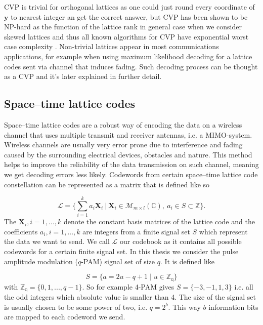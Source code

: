 \documentclass[english,12pt,a4paper,pdftex,sci,utf8]{aaltothesis}
\begin{document}
CVP is trivial for orthogonal lattices as one could just round every coordinate of $\mathbf{y}$ to nearest integer an get the correct answer, but CVP has been shown to be NP-hard as the function of the lattice rank in general case when we consider skewed lattices and thus all known algorithms for CVP have exponential worst case complexity \cite{agrell}. Non-trivial lattices appear in most communications applications, for example when using maximum likelihood decoding for a lattice codes sent via channel that induces fading. Such decoding process can be thought as a CVP and it's later explained in further detail.

\subsection{Space--time lattice codes}

Space--time lattice codes are a robust way of encoding the data on a  wireless channel that uses multiple transmit and receiver antennas, i.e. a MIMO-system. Wireless channels are usually very error prone due to interference and fading caused by the surrounding electrical devices, obstacles and nature. This method helps to improve the reliability of the data transmission on such channel, meaning we get decoding errors less likely. Codewords from certain space--time lattice code constellation can be represented as a matrix that is defined like so

\begin{equation}
\mathcal{L} = \Bigg\{\sum_{i=1}^k a_i\mathbf{X}_i \ \Big| \ \mathbf{X}_i \in \mathcal{M}_{m \times l}(\mathbb{C}), \ a_i \in S \subset \mathbb{Z} \Bigg\}.
\label{eq:codeword}
\end{equation}
The $\mathbf{X}_i, i = 1,...,k$ denote the constant basis matrices of the lattice code and the coefficients $a_i, i = 1,...,k$ are integers from a finite signal set $S$ which represent the data we want to send. We call $\mathcal{L}$ our codebook as it contains all possible codewords for a certain finite signal set. In this thesis we consider the pulse amplitude modulation ($q$-PAM) signal set of size $q$. It is defined like

\begin{equation}
S = \{a = 2u-q+1\mid u \in \mathbb{Z_q}\}
\label{eq:pam}
\end{equation}
with $\mathbb{Z_q} = \{0,1,...,q-1\}$. So for example 4-PAM gives $S = \{-3, -1,1,3\}$ i.e. all the odd integers which absolute value is smaller than 4. The size of the signal set is usually chosen to be some power of two, i.e. $q = 2^b$. This way $b$ information bits are mapped to each codeword we send. \cite{mia} 
\end{document}
